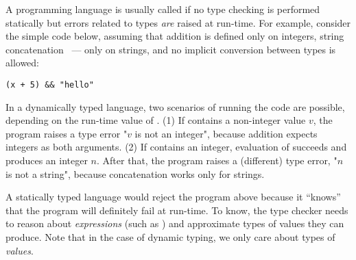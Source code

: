 A programming language is usually called 
if no type checking is performed statically
but errors related to types \emph{are} raised at run-time.
For example, consider the simple code below, assuming that
addition \jlcode{(+)} is defined only on integers, 
string concatenation \jlcode{(\&\&)}~--- only on strings,
and no implicit conversion between types is allowed:
\begin{verbatim}
(x + 5) && "hello"
\end{verbatim}
In a dynamically typed language, two scenarios of running the code are possible,
depending on the run-time value of .
(1) If  contains a non-integer value $v$, 
the program raises a type error "$v$ is not an integer",
because addition expects integers as both arguments.
(2) If  contains an integer,
evaluation of  succeeds and produces an integer $n$.
After that, the program raises a (different) type error, "$n$ is not a string", 
because concatenation works only for strings.

A statically typed language would reject the program above
because it ``knows'' that the program will definitely fail at run-time.
To know, the type checker needs to reason about \emph{expressions}
(such as ) and approximate types of values they can produce.
Note that in the case of dynamic typing, we only care about
types of \emph{values}. %



